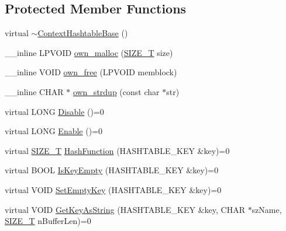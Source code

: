 \subsection*{Protected Member Functions}
\begin{DoxyCompactItemize}
\item 
virtual \hyperlink{class_context_hashtable_base_a7b3d376e96ee4db9dc5d35bc53fa3a94}{$\sim$\-Context\-Hashtable\-Base} ()
\item 
\-\_\-\-\_\-inline L\-P\-V\-O\-I\-D \hyperlink{class_context_hashtable_base_a1f82999889f8daf4685defcb07aa9682}{own\-\_\-malloc} (\hyperlink{_stack_walker_8h_abf8e46e57d5b85295601cefa33de3b7a}{S\-I\-Z\-E\-\_\-\-T} size)
\item 
\-\_\-\-\_\-inline V\-O\-I\-D \hyperlink{class_context_hashtable_base_a5baa1e1b3ef680e766d9c7e09ea4072d}{own\-\_\-free} (L\-P\-V\-O\-I\-D memblock)
\item 
\-\_\-\-\_\-inline C\-H\-A\-R $\ast$ \hyperlink{class_context_hashtable_base_a8ed2fe1de11ddc14166561fa8daa672b}{own\-\_\-strdup} (const char $\ast$str)
\item 
virtual L\-O\-N\-G \hyperlink{class_context_hashtable_base_adaa530038082c99bfd626839e7acb432}{Disable} ()=0
\item 
virtual L\-O\-N\-G \hyperlink{class_context_hashtable_base_aab087f34a336804de3d6a52d039925da}{Enable} ()=0
\item 
virtual \hyperlink{_stack_walker_8h_abf8e46e57d5b85295601cefa33de3b7a}{S\-I\-Z\-E\-\_\-\-T} \hyperlink{class_context_hashtable_base_a46644ec231bde25eb5ba65273238378a}{Hash\-Function} (H\-A\-S\-H\-T\-A\-B\-L\-E\-\_\-\-K\-E\-Y \&key)=0
\item 
virtual B\-O\-O\-L \hyperlink{class_context_hashtable_base_ae9be16961cfd34d36c8fd1fb92383ff6}{Is\-Key\-Empty} (H\-A\-S\-H\-T\-A\-B\-L\-E\-\_\-\-K\-E\-Y \&key)=0
\item 
virtual V\-O\-I\-D \hyperlink{class_context_hashtable_base_adec5d46fd137c9d770538fa843a79cba}{Set\-Empty\-Key} (H\-A\-S\-H\-T\-A\-B\-L\-E\-\_\-\-K\-E\-Y \&key)=0
\item 
virtual V\-O\-I\-D \hyperlink{class_context_hashtable_base_a343e78471bc33fbed729a083cbed6663}{Get\-Key\-As\-String} (H\-A\-S\-H\-T\-A\-B\-L\-E\-\_\-\-K\-E\-Y \&key, C\-H\-A\-R $\ast$sz\-Name, \hyperlink{_stack_walker_8h_abf8e46e57d5b85295601cefa33de3b7a}{S\-I\-Z\-E\-\_\-\-T} n\-Buffer\-Len)=0
\end{DoxyCompactItemize}


